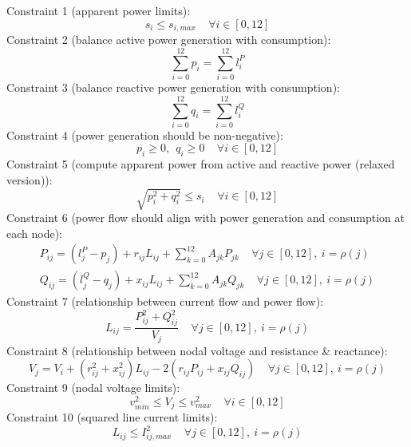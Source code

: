 \documentclass[12pt]{article}
\begin{document}
\subsection{}
Constraint 1 (apparent power limits): 
\begin{equation}
s_i\leq s_{i,max}\ \ \ \ \ \forall i\in [0, 12]
\end{equation}
Constraint 2 (balance active power generation with consumption):
\begin{equation}
\sum_{i=0}^{12}p_i=\sum_{i=0}^{12}l_i^P
\end{equation}
Constraint 3 (balance reactive power generation with consumption):
\begin{equation}
\sum_{i=0}^{12}q_i=\sum_{i=0}^{12}l_i^Q
\end{equation}
Constraint 4 (power generation should be non-negative):
\begin{equation}
p_i\geq 0,\ \ q_i\geq 0 \ \ \ \ \ \forall i\in [0, 12]
\end{equation}
Constraint 5 (compute apparent power from active and reactive power (relaxed version)):
\begin{equation}
\sqrt{p_i^2+q_i^2}\leq s_i \ \ \ \ \ \forall i\in [0, 12]
\end{equation}
Constraint 6 (power flow should align with power generation and consumption at each node):
\begin{align}
P_{ij}=(l_j^P-p_j)+r_{ij}L_{ij}+\sum_{k=0}^{12}A_{jk}P_{jk} \ \ \ \ \ \forall j\in [0, 12],\ i=\rho(j)\\
Q_{ij}=(l_j^Q-q_j)+x_{ij}L_{ij}+\sum_{k=0}^{12}A_{jk}Q_{jk} \ \ \ \ \ \forall j\in [0, 12],\ i=\rho(j)
\end{align}
Constraint 7 (relationship between current flow and power flow):
\begin{equation}
L_{ij}=\frac{P_{ij}^2+Q_{ij}^2}{V_j} \ \ \ \ \ \forall j\in [0, 12],\ i=\rho(j)
\end{equation}
Constraint 8 (relationship between nodal voltage and resistance \& reactance):
\begin{equation}
V_j=V_i+(r_{ij}^2+x_{ij}^2)L_{ij}-2(r_{ij}P_{ij}+x_{ij}Q_{ij}) \ \ \ \ \ \forall j\in [0, 12],\ i=\rho(j)
\end{equation}
Constraint 9 (nodal voltage limits):
\begin{equation}
v_{min}^2\leq V_j\leq v_{max}^2\ \ \ \ \ \forall i\in [0, 12]
\end{equation}
Constraint 10 (squared line current limits):
\begin{equation}
L_{ij}\leq I_{ij,max}^2 \ \ \ \ \ \forall j\in [0, 12],\ i=\rho(j)
\end{equation}
\end{document}
